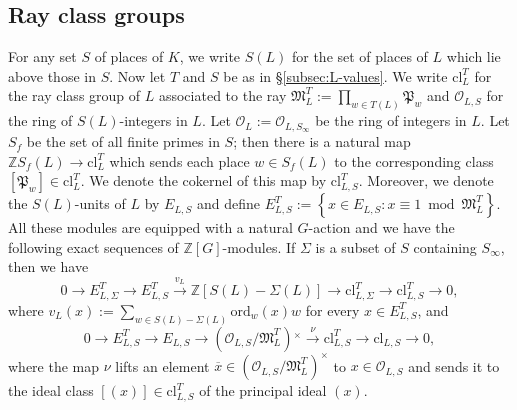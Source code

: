 \documentclass[12pt]{amsart}
\theoremstyle{plain}
\theoremstyle{remark}
\theoremstyle{definition}
\numberwithin{equation}{section}
\begin{document}
{\subsection{Ray class groups}
For any set $S$ of places of $K$, we write $S(L)$ for the set of places of $L$ which lie above those in $S$.
Now let $T$ and $S$ be as in \S \ref{subsec:L-values}.
We write ${\mathrm{cl}}_{L}^{T}$ for the ray class group of $L$ associated to the ray
$\mathfrak{M}_{L}^{T} := \prod_{w \in T(L)} \mathfrak{P}_w$ and $\mathcal{O}_{L,S}$ for the ring of $S(L)$-integers in $L$.
Let $\mathcal{O}_{L} := \mathcal{O}_{L, S_{\infty}}$ be the ring of integers in $L$.
Let $S_{f}$ be the set of all finite primes in $S$;
then there is a natural map ${\mathbb{Z}} S_{f}(L) \to {\mathrm{cl}}_{L}^{T}$ which sends each place $w \in S_{f}(L)$
to the corresponding class $[\mathfrak{P}_w] \in {\mathrm{cl}}_{L}^{T}$. We denote the cokernel of this map by ${\mathrm{cl}}_{L,S}^{T}$.
Moreover, we denote the $S(L)$-units of $L$ by $E_{L,S}$ and define
$E_{L,S}^T := \left\{x \in E_{L,S}: x \equiv 1 \bmod \mathfrak{M}_{L}^{T} \right\}$.
All these modules are equipped with a natural $G$-action and we have the following exact sequences of ${\mathbb{Z}}[G]$-modules.
If $\Sigma$ is a subset of $S$ containing $S_{\infty}$, then we have
\begin{equation}\label{eqn:ray_class_sequence_ZS}
0 \longrightarrow E_{L, \Sigma}^T \longrightarrow E_{L,S}^T \stackrel{v_{L}}{\longrightarrow}
{\mathbb{Z}} [S(L) - \Sigma(L)] \longrightarrow {\mathrm{cl}}_{L, \Sigma}^{T} \longrightarrow {\mathrm{cl}}_{L,S}^{T} \longrightarrow 0,
\end{equation}
where $v_{L}(x) := \sum_{w \in S(L) - \Sigma(L)} {\mathrm{ord}}_w(x) w$ for every $x \in E_{L,S}^T$, and
\begin{equation}\label{eqn:ray_class_sequence}
0 \longrightarrow E_{L,S}^T \longrightarrow E_{L,S} \longrightarrow (\mathcal{O}_{L,S} / \mathfrak{M}_{L}^{T}){^{\times}}
\stackrel{\nu}{\longrightarrow} {\mathrm{cl}}_{L,S}^{T} \longrightarrow {\mathrm{cl}}_{L,S} \longrightarrow 0,
\end{equation}
where the map $\nu$ lifts an element $\overline x \in (\mathcal{O}_{L,S} / \mathfrak{M}_{L}^{T})^{\times}$ to
$x \in \mathcal{O}_{L,S}$ and
sends it to the ideal class $[(x)] \in {\mathrm{cl}}_{L,S}^{T}$ of the principal ideal $(x)$.

}
\end{document}
